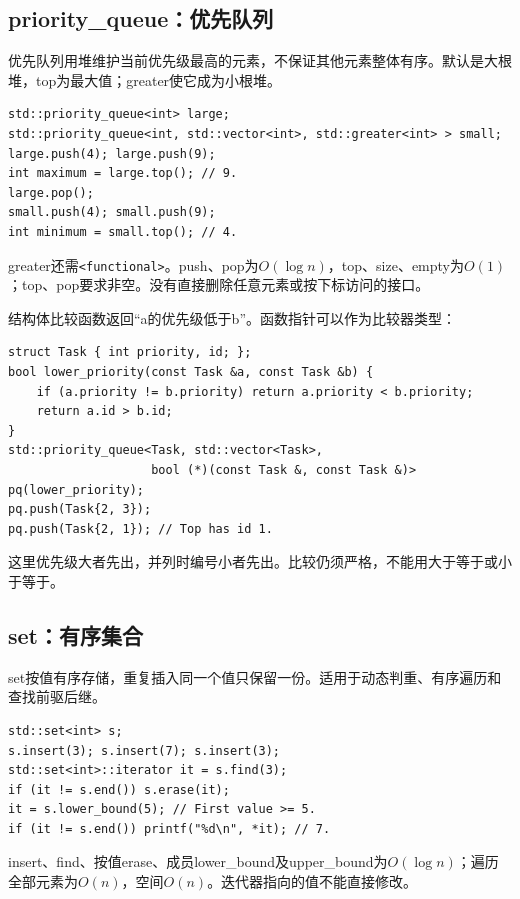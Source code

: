 \documentclass[UTF8,11pt,a4paper,fontset=none]{ctexart}
\begin{document}
\subsection{priority\_queue：优先队列}
优先队列用堆维护当前优先级最高的元素，不保证其他元素整体有序。默认是大根堆，top为最大值；greater使它成为小根堆。
\par\noindent\begin{minipage}{\linewidth}
\begin{lstlisting}
std::priority_queue<int> large;
std::priority_queue<int, std::vector<int>, std::greater<int> > small;
large.push(4); large.push(9);
int maximum = large.top(); // 9.
large.pop();
small.push(4); small.push(9);
int minimum = small.top(); // 4.
\end{lstlisting}
\end{minipage}\par
greater还需\texttt{<functional>}。push、pop为$O(\log n)$，top、size、empty为$O(1)$；top、pop要求非空。没有直接删除任意元素或按下标访问的接口。

结构体比较函数返回“a的优先级低于b”。函数指针可以作为比较器类型：
\par\noindent\begin{minipage}{\linewidth}
\begin{lstlisting}
struct Task { int priority, id; };
bool lower_priority(const Task &a, const Task &b) {
    if (a.priority != b.priority) return a.priority < b.priority;
    return a.id > b.id;
}
std::priority_queue<Task, std::vector<Task>,
                    bool (*)(const Task &, const Task &)> pq(lower_priority);
pq.push(Task{2, 3});
pq.push(Task{2, 1}); // Top has id 1.
\end{lstlisting}
\end{minipage}\par
这里优先级大者先出，并列时编号小者先出。比较仍须严格，不能用大于等于或小于等于。

\subsection{set：有序集合}
set按值有序存储，重复插入同一个值只保留一份。适用于动态判重、有序遍历和查找前驱后继。
\par\noindent\begin{minipage}{\linewidth}
\begin{lstlisting}
std::set<int> s;
s.insert(3); s.insert(7); s.insert(3);
std::set<int>::iterator it = s.find(3);
if (it != s.end()) s.erase(it);
it = s.lower_bound(5); // First value >= 5.
if (it != s.end()) printf("%d\n", *it); // 7.
\end{lstlisting}
\end{minipage}\par
insert、find、按值erase、成员lower\_bound及upper\_bound为$O(\log n)$；遍历全部元素为$O(n)$，空间$O(n)$。迭代器指向的值不能直接修改。
\end{document}
